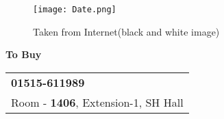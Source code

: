 \documentclass{article}
\begin{document}
\vspace*{\fill}
\begin{center}
  \begin{figure}
  \texttt{[image: Date.png]}
    \caption{Taken from Internet(black and white image)}
  \end{figure}
  {\Huge\textbf{To Buy}}
\\
  \LARGE
\vspace{2cm}
  \begin{tabular}{l}
    \faPhone{} \textbf{01515-611989}\\
    \faHome{} Room - \textbf{1406}, Extension-1, SH Hall
  \end{tabular}
\end{center}
\vspace*{\fill}
 
\end{document}
